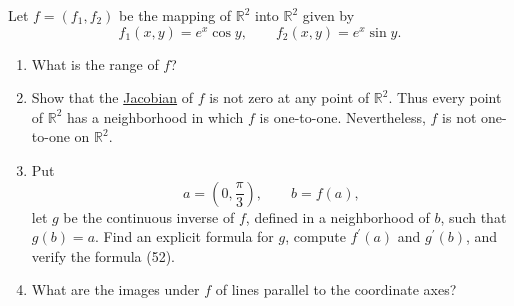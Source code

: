 	\begin{exercise}[Rudin 9.17]
		Let $f=(f_1,f_2)$ be the mapping of $\mathbb{R}^2$ into $\mathbb{R}^2$ given by
		\begin{equation}
			f_1(x,y)=e^x\cos y,
			\qquad
			f_2(x,y)=e^x\sin y.
		\end{equation}

		\begin{enumerate}[label=(\alph*)]
			\item What is the range of $f$?

			\item Show that the \hyperref[def:jacobian]{Jacobian} of $f$ is not zero at any point of $\mathbb{R}^2$. Thus every point of $\mathbb{R}^2$ has a neighborhood in which $f$ is one-to-one. Nevertheless, $f$ is not one-to-one on $\mathbb{R}^2$.

			\item Put
			\begin{equation}
				a=\left(0,\frac{\pi}{3}\right),
				\qquad
				b=f(a),
			\end{equation}
			let $g$ be the continuous inverse of $f$, defined in a neighborhood of $b$, such that $g(b)=a$. Find an explicit formula for $g$, compute $f^\prime(a)$ and $g^\prime(b)$, and verify the formula (52).

			\item What are the images under $f$ of lines parallel to the coordinate axes?
		\end{enumerate}
	\end{exercise}
